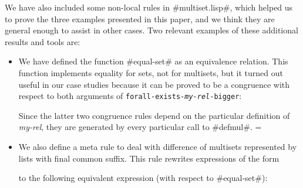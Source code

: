 \documentclass[11pt]{llncs}
\begin{document}
{We have also included some non-local rules in #multiset.lisp#, which
helped us to prove the three examples presented in this paper, and we
think they are general enough to assist in other cases. Two relevant
examples of these additional results and tools are:

\begin{itemize}
\item We have defined  the function #equal-set# as an equivalence
relation. This function implements equality for sets,
not for multisets, but it turned out useful in our case studies because
it can be proved to be a congruence with respect to both
arguments of {\tt forall-exists-{\em my\--rel}-bigger}:

\vspace{2mm}
\hspace{2mm}{\tt (defun equal-set (x y) (and (subsetp x y) (subsetp y x))=
)}

\vspace{2mm}
\hspace{2mm}{\tt (defequiv equal-set)}

\vspace{2mm}

\vspace{2mm}

\vspace{2mm}
Since the latter two congruence rules depend on the particular
definition of {\em my-rel}, they are generated by every particular
call to #defmul#. =


\vspace{2mm}

\item We also define a meta rule to deal with difference of multisets
represented by lists with final common suffix. This rule
rewrites expressions of the form

\vspace{2mm}
\hspace{2mm}{\tt (multiset-diff (list* $x_1$ $x_2\ldots x_m$ l) (list* $y=
_1$ $y_2\ldots y_k$ l))}
\vspace{2mm}

to the following equivalent expression (with respect to #equal-set#):

\vspace{2mm}
\hspace{2mm}{\tt (multiset-diff (list $x_1$ $x_2\ldots x_m$) (list $y_1$ =
$y_2\ldots y_k$))}
\vspace{2mm}


\end{itemize}}
\end{document}
